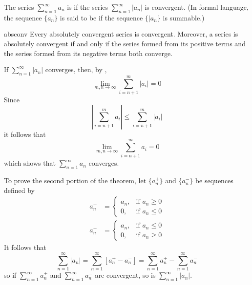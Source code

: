 \documentclass[12pt]{report}
\begin{document}
\begin{defn}{}{}
    The series $\sum\limits_{n=1}^{\infty}a_n$ is  if the series $\sum\limits_{n=1}^{\infty}|a_n|$ is convergent. (In formal language, the sequence $\{a_n\}$ is said to be  if the sequence $\{|a_n\}$ is summable.)
\end{defn}

\begin{thm}{}{absconv}
    Every absolutely convergent series is convergent. Moreover, a series is absolutely convergent if and only if the series formed from its positive terms and the series formed from its negative terms both converge.
\end{thm}
\begin{proof*}{}{}
    If $\sum\limits_{n=1}^{\infty}|a_n|$ converges, then, by , \begin{equation*}
        \lim\limits_{m,n\rightarrow \infty}\sum\limits_{i=n+1}^m|a_i| = 0
    \end{equation*}
    Since \begin{equation*}
        \left|\sum\limits_{i=n+1}^ma_i\right| \leq \sum\limits_{i=n+1}^m|a_i|
    \end{equation*}
    it follows that  \begin{equation*}
        \lim\limits_{m,n\rightarrow \infty}\sum\limits_{i=n+1}^ma_i = 0
    \end{equation*}
    which shows that $\sum\limits_{n=1}^{\infty}a_n$ converges.

    To prove the second portion of the theorem, let $\{a_n^+\}$ and $\{a_n^-\}$ be sequences defined by \begin{align*}
        a_n^+ &= \left\{\begin{array}{lc} a_n, & \text{if } a_n\geq 0 \\ 0, & \text{if } a_n \leq 0 \end{array}\right. \\
            a_n^- &= \left\{\begin{array}{lc} a_n, & \text{if } a_n\leq 0 \\ 0, & \text{if } a_n \geq 0 \end{array}\right.
    \end{align*}
    It follows that \begin{equation*}
        \sum\limits_{n=1}^{\infty}|a_n| = \sum\limits_{n=1}^{\infty}[a_n^+-a_n^-] = \sum\limits_{n=1}^{\infty}a_n^+ - \sum\limits_{n=1}^{\infty}a_n^-
    \end{equation*}
    so if $\sum\limits_{n=1}^{\infty}a_n^+$ and $\sum\limits_{n=1}^{\infty}a_n^-$ are convergent, so is $\sum\limits_{n=1}^{\infty}|a_n|$.



\end{proof*}
\end{document}

